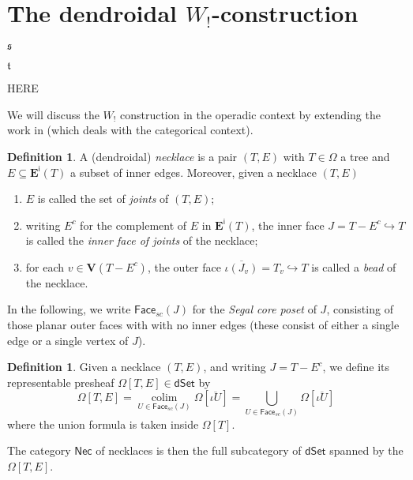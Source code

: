 \documentclass[a4paper,10pt
,draft
]{article}%
\numberwithin{equation}{section}
\numberwithin{figure}{section}
\theoremstyle{definition} %
\newtheorem{definition}[equation]{Definition}%
\DeclareMathOperator{\colim}{colim}%
\newcommand{\1}{\ensuremath{\mathbbm 1}}%
\begin{document}
\newpage
\appendix





\section{The dendroidal $W_!$-construction}


$\mathfrak{s}$


$\mathfrak{t}$

{\color{red} HERE}


We will discuss the $W_!$
construction in the operadic context by extending the 
work in \cite{DS11}
(which deals with the categorical context).


\begin{definition}
A (dendroidal) \emph{necklace} is a pair $(T,E)$
with $T \in \Omega$
a tree and
$E \subseteq \boldsymbol{E}^{\mathsf{i}}(T)$
a subset of inner edges.
%
Moreover, given a necklace $(T,E)$
\begin{enumerate}[label = (\roman*)]
\item $E$ is called the set of \emph{joints} of $(T,E)$;
\item writing $E^c$ for the complement of $E$ in 
$\boldsymbol{E}^{\mathsf{i}}(T)$,
the inner face $J=T-E^c \hookrightarrow T$
is called the \emph{inner face of joints} of the necklace;
\item for each $v \in \boldsymbol{V}(T-E^c)$,
the outer face
$\overline{\iota(J_v)} = T_v \hookrightarrow T$
is called a \emph{bead} of the necklace.
\end{enumerate}
\end{definition}

In the following, we write 
$\mathsf{Face}_{sc}(J)$ for the \emph{Segal core poset} of $J$,
consisting of those planar outer faces with with no inner edges
(these consist of either a single edge or a single vertex of $J$).

\begin{definition}
	Given a necklace 
	$(T,E)$, 
	and writing $J = T-E^c$,
	we define its representable presheaf
	$\Omega[T,E] \in \mathsf{dSet}$ by
\begin{equation}
	\Omega[T,E] 
= 
	\underset{U \in \mathsf{Face}_{sc}(J)}{\colim}
	\Omega[\overline{\iota U}]
=
	\bigcup_{U \in \mathsf{Face}_{sc}(J)} 
	\Omega[\overline{\iota U}]
\end{equation}
	where the union formula is taken inside $\Omega[T]$.
	
	The category $\mathsf{Nec}$ of necklaces is then the full subcategory of $\mathsf{dSet}$
	spanned by the $\Omega[T,E]$.
\end{definition}
\end{document}
